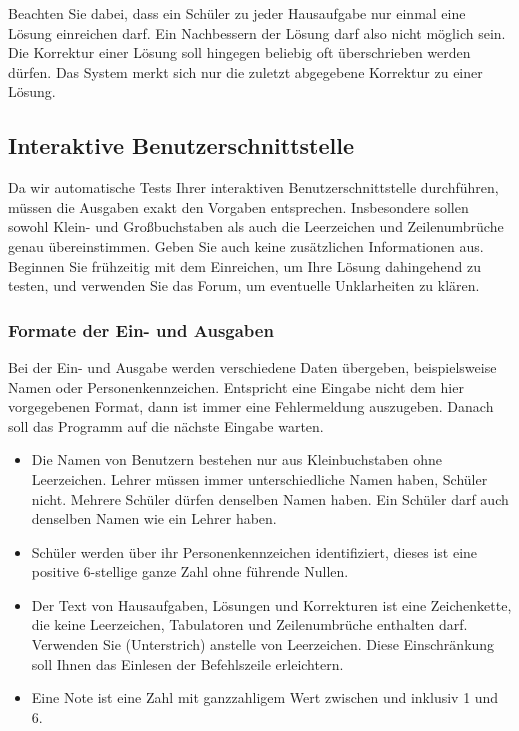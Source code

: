 \documentclass{sdqassignment}
\begin{document}
Beachten Sie dabei, dass ein Schüler zu jeder Hausaufgabe nur einmal eine Lösung einreichen darf. Ein Nachbessern der Lösung darf also nicht möglich sein. Die Korrektur einer Lösung soll hingegen beliebig oft überschrieben werden dürfen. Das System merkt sich nur die zuletzt abgegebene Korrektur zu einer Lösung.

\subsection{Interaktive Benutzerschnittstelle}
Da wir automatische Tests Ihrer interaktiven Benutzerschnittstelle durchführen, müssen die Ausgaben exakt den Vorgaben entsprechen. Insbesondere sollen sowohl Klein- und Großbuchstaben als auch die Leerzeichen und Zeilenumbrüche genau übereinstimmen. Geben Sie auch keine zusätzlichen Informationen aus. Beginnen Sie frühzeitig mit dem Einreichen, um Ihre Lösung dahingehend zu testen, und verwenden Sie das Forum, um eventuelle Unklarheiten zu klären.

\subsubsection{Formate der Ein- und Ausgaben}
Bei der Ein- und Ausgabe werden verschiedene Daten übergeben, beispielsweise Namen oder Personenkennzeichen. Entspricht eine Eingabe nicht dem hier vorgegebenen Format, dann ist immer eine Fehlermeldung auszugeben. Danach soll das Programm auf die nächste Eingabe warten.
\begin{itemize}
    \item Die Namen von Benutzern bestehen nur aus Kleinbuchstaben ohne Leerzeichen. Lehrer müssen immer unterschiedliche Namen haben, Schüler nicht. Mehrere Schüler dürfen denselben Namen haben. Ein Schüler darf auch denselben Namen wie ein Lehrer haben.
    \item Schüler werden über ihr Personenkennzeichen identifiziert, dieses ist eine positive 6-stellige ganze Zahl ohne führende Nullen.
    \item Der Text von Hausaufgaben, Lösungen und Korrekturen ist eine Zeichenkette, die keine Leerzeichen, Tabulatoren und Zeilenumbrüche enthalten darf. Verwenden Sie \lstinlinetxt{_} (Unterstrich) anstelle von Leerzeichen. Diese Einschränkung soll Ihnen das Einlesen der Befehlszeile erleichtern.
    \item Eine Note ist eine Zahl mit ganzzahligem Wert zwischen und inklusiv 1 und 6.
\end{itemize}
\end{document}
